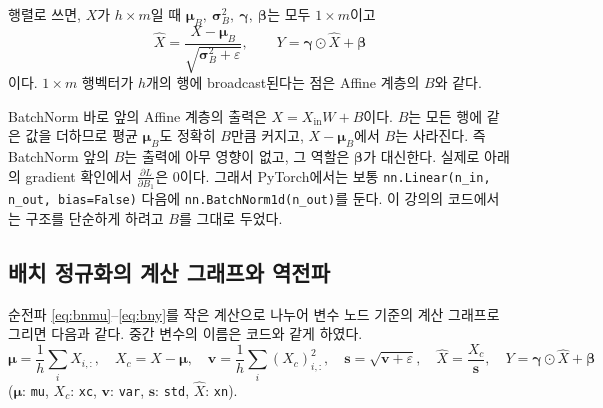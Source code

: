\documentclass[11pt,a4paper]{article}
\newcommand{\pd}[2]{\frac{\partial #1}{\partial #2}}
\begin{document}
행렬로 쓰면, $X$가 $h\times m$일 때 $\bm\mu_B,\ \bm\sigma_B^2,\ \bm\gamma,\ \bm\beta$는 모두 $1\times m$이고
\[
\hat X=\frac{X-\bm\mu_B}{\sqrt{\bm\sigma_B^2+\varepsilon}},\qquad
Y=\bm\gamma\odot\hat X+\bm\beta
\]
이다. $1\times m$ 행벡터가 $h$개의 행에 broadcast된다는 점은 Affine 계층의 $B$와 같다.

\begin{thinkbox}
BatchNorm 바로 앞의 Affine 계층의 출력은 $X=X_{\text{in}}W+B$이다.
$B$는 모든 행에 같은 값을 더하므로 평균 $\bm\mu_B$도 정확히 $B$만큼 커지고,
$X-\bm\mu_B$에서 $B$는 사라진다.
즉 BatchNorm 앞의 $B$는 출력에 아무 영향이 없고, 그 역할은 $\bm\beta$가 대신한다.
실제로 아래의 gradient 확인에서 $\pd{L}{B_1}$은 $0$이다.
그래서 PyTorch에서는 보통 \texttt{nn.Linear(n\_in, n\_out, bias=False)} 다음에 \texttt{nn.BatchNorm1d(n\_out)}를 둔다.
이 강의의 코드에서는 구조를 단순하게 하려고 $B$를 그대로 두었다.
\end{thinkbox}

\subsection{배치 정규화의 계산 그래프와 역전파}\label{sec:bngraph}

순전파 \eqref{eq:bnmu}--\eqref{eq:bny}를 작은 계산으로 나누어 변수 노드 기준의 계산 그래프로 그리면 다음과 같다.
중간 변수의 이름은 코드와 같게 하였다.
\[
\bm\mu=\frac1h\sum_{i}X_{i,:},\quad
X_c=X-\bm\mu,\quad
\bm v=\frac1h\sum_{i}(X_c)_{i,:}^2,\quad
\bm s=\sqrt{\bm v+\varepsilon},\quad
\hat X=\frac{X_c}{\bm s},\quad
Y=\bm\gamma\odot\hat X+\bm\beta
\]
($\bm\mu$: \texttt{mu}, $X_c$: \texttt{xc}, $\bm v$: \texttt{var}, $\bm s$: \texttt{std}, $\hat X$: \texttt{xn}).
\end{document}
